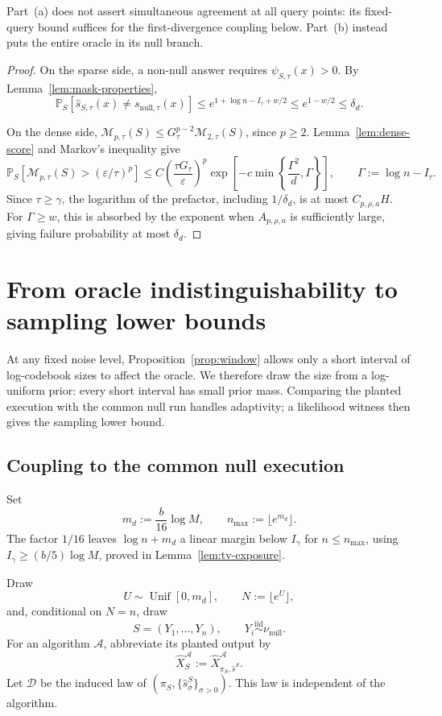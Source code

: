\documentclass[11pt,letterpaper]{article}
\newcommand{\eps}{\varepsilon}
\newcommand{\1}{\mathbbm{1}}
\DeclareMathOperator{\Unif}{Unif}
\newcommand{\Prob}{\mathbb P}
\begin{document}
Part~\textup{(a)} does not assert simultaneous agreement at all query
points: its fixed-query bound suffices for the first-divergence coupling
below.  Part~\textup{(b)} instead puts the entire oracle in its null branch.

\begin{proof}
On the sparse side, a non-null answer requires
\(\psi_{S,\tau}(x)>0\).  By Lemma~\ref{lem:mask-properties},
\[
   \Prob_S[\widehat s_{S,\tau}(x)\ne s_{\mathrm{null},\tau}(x)]
   \le e^{1+\log n-I_\tau+w/2}
   \le e^{1-w/2}\le\delta_d.
\]

On the dense side, \(\mathcal M_{p,\tau}(S)\le
G_\tau^{p-2}\mathcal M_{2,\tau}(S)\), since \(p\ge2\).
Lemma~\ref{lem:dense-score} and Markov's inequality give
\[
   \Prob_S[\mathcal M_{p,\tau}(S)>(\eps/\tau)^p]
   \le C\left(\frac{\tau G_\tau}{\eps}\right)^p
      \exp\left[-c\min\left\{\frac{\Gamma^2}{d},\Gamma\right\}\right],
   \qquad \Gamma:=\log n-I_\tau.
\]
Since \(\tau\ge\gamma\), the logarithm of the prefactor, including
\(1/\delta_d\), is at most \(C_{p,\rho,a}H\).  For \(\Gamma\ge w\),
this is absorbed by the exponent when \(A_{p,\rho,a}\) is sufficiently
large, giving failure probability at most \(\delta_d\).
\end{proof}

\section{From oracle indistinguishability to sampling lower bounds}
\label{sec:completion}

At any fixed noise level, Proposition~\ref{prop:window} allows only a
short interval of log-codebook sizes to affect the oracle.  We
therefore draw the size from a log-uniform prior: every short interval
has small prior mass.  Comparing the planted execution with the common
null run handles adaptivity; a likelihood witness then gives the
sampling lower bound.

\subsection{Coupling to the common null execution}
\label{sec:blind-output}

Set
\[
   m_d:=\frac b{16}\log M,
   \qquad n_{\max}:=\lfloor e^{m_d}\rfloor.
\]
The factor \(1/16\) leaves \(\log n+m_d\) a linear margin below
\(I_\gamma\) for \(n\le n_{\max}\), using
\(I_\gamma\ge(b/5)\log M\), proved in Lemma~\ref{lem:tv-exposure}.

Draw
\[
   U\sim\Unif[0,m_d],
   \qquad
   N:=\lfloor e^U\rfloor,
\]
and, conditional on \(N=n\), draw
\[
   S=(Y_1,\ldots,Y_n),
   \qquad Y_i\stackrel{\mathrm{iid}}\sim\nu_{\mathrm{null}}.
\]
For an algorithm \(\mathcal A\), abbreviate its planted output by
\[
   \widehat X_S^{\mathcal A}
   :=\widehat X_{\pi_S,\widehat s^S}^{\mathcal A}.
\]
Let \(\mathcal D\) be the induced law of
\((\pi_S,\{\widehat s^S_\sigma\}_{\sigma>0})\).
This law is independent of the algorithm.
\end{document}

